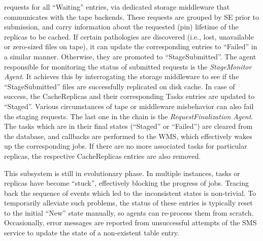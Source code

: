\documentclass[10pt,conference]{IEEEtran}
\begin{document}
requests for all “Waiting” entries, via dedicated storage middleware that
communicates with the tape backends. These requests are grouped by SE prior to
submission, and carry information about the requested (pin) lifetime of the
replicas to be cached. If certain pathologies are discovered (i.e., lost,
unavailable or zero-sized files on tape), it can update the corresponding
entries to “Failed” in a similar manner. Otherwise, they are promoted to
“StageSubmitted”. The agent responsible for monitoring the status of submitted
requests is the \textit{StageMonitor Agent}. It achieves this by interrogating the
storage middleware to see if the “StageSubmitted” files are successfully
replicated on disk cache. In case of success, the CacheReplicas and their
corresponding Tasks entries are updated to “Staged”. Various circumstances of
tape or middleware misbehavior can also fail the staging requests. The last one
in the chain is the \textit{RequestFinalization Agent}. The tasks which are in their
final states (“Staged” or “Failed”) are cleared from the database, and callbacks
are performed to the WMS, which effectively wakes up the corresponding jobs. If
there are no more associated tasks for particular replicas, the respective
CacheReplicas entries are also removed.

This subsystem is still in evolutionary phase. In multiple instances, tasks or
replicas have become “stuck”, effectively blocking the progress of jobs. Tracing
back the sequence of events which led to the inconsistent states is non-trivial.
To temporarily alleviate such problems, the status of these entries is typically
reset to the initial “New” state manually, so agents can re-process them from
scratch. Occasionally, error messages are reported from unsuccessful attempts of
the SMS service to update the state of a non-existent table entry.

 

\end{document}
